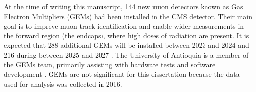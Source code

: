 At the time of writing this manuscript, 144 new muon detectors known as Gas Electron Multipliers (GEMs) had been installed in the CMS detector. Their main goal is to improve muon track identification and enable wider measurements in the forward region (the endcaps), where high doses of radiation are present. It is expected that 288 additional GEMs will be installed between 2023 and 2024 and 216 during between 2025 and 2027 \cite{cern2020ls2, cerngems}. The University of Antioquia is a member of the GEMs team, primarily assisting with hardware tests and software development \cite{cms25udea}. GEMs are not significant for this dissertation because the data used for analysis was collected in 2016.